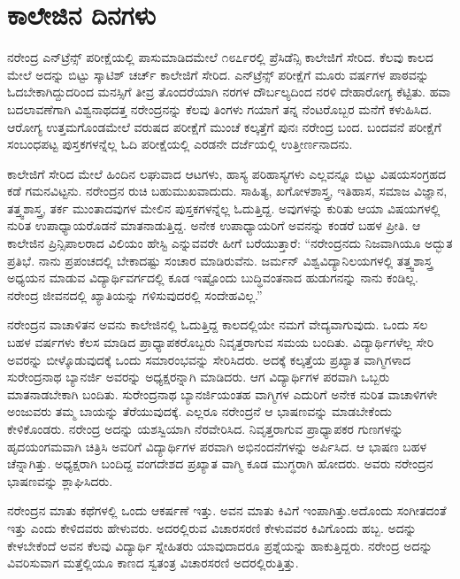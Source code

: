 
\chapter{ಕಾಲೇಜಿನ ದಿನಗಳು }

ನರೇಂದ್ರ ಎನ್‍ಟ್ರೆನ್ಸ್ ಪರೀಕ್ಷೆಯಲ್ಲಿ ಪಾಸುಮಾಡಿದಮೇಲೆ ೧೮೭೯ರಲ್ಲಿ ಪ್ರೆಸಿಡೆನ್ಸಿ ಕಾಲೇಜಿಗೆ ಸೇರಿದ. ಕೆಲವು ಕಾಲದ ಮೇಲೆ ಅದನ್ನು ಬಿಟ್ಟು ಸ್ಕಾಟಿಶ್ ಚರ್ಚ್ ಕಾಲೇಜಿಗೆ ಸೇರಿದ. ಎನ್‍ಟ್ರೆನ್ಸ್ ಪರೀಕ್ಷೆಗೆ ಮೂರು ವರ್ಷಗಳ ಪಾಠವನ್ನು ಓದಬೇಕಾಗಿದ್ದುದರಿಂದ ಮನಸ್ಸಿಗೆ ತೀವ್ರ ತೊಂದರೆಯಾಗಿ ನರಗಳ ದೌರ್ಬಲ್ಯದಿಂದ ನರಳಿ ದೇಹಾರೋಗ್ಯ ಕೆಟ್ಟಿತು. ಹವಾ ಬದಲಾವಣೆಗಾಗಿ ವಿಶ್ವನಾಥದತ್ತ ನರೇಂದ್ರನನ್ನು ಕೆಲವು ತಿಂಗಳು ಗಯಾಗೆ ತನ್ನ ನೆಂಟರೊಬ್ಬರ ಮನೆಗೆ ಕಳುಹಿಸಿದ. ಆರೋಗ್ಯ ಉತ್ತಮಗೊಂಡಮೇಲೆ ವರುಷದ ಪರೀಕ್ಷೆಗೆ ಮುಂಚೆ ಕಲ್ಕತ್ತೆಗೆ ಪುನಃ ನರೇಂದ್ರ ಬಂದ. ಬಂದವನೆ ಪರೀಕ್ಷೆಗೆ ಸಂಬಂಧಪಟ್ಟ ಪುಸ್ತಕಗಳನ್ನೆಲ್ಲ ಓದಿ ಪರೀಕ್ಷೆಯಲ್ಲಿ ಎರಡನೇ ದರ್ಜೆಯಲ್ಲಿ ಉತ್ತೀರ್ಣನಾದನು.

ಕಾಲೇಜಿಗೆ ಸೇರಿದ ಮೇಲೆ ಹಿಂದಿನ ಲಘುವಾದ ಆಟಗಳು, ಹಾಸ್ಯ ಪರಿಹಾಸ್ಯಗಳು ಎಲ್ಲವನ್ನೂ ಬಿಟ್ಟು ವಿಷಯಸಂಗ್ರಹದ ಕಡೆ ಗಮನವಿಟ್ಟನು. ನರೇಂದ್ರನ ರುಚಿ ಬಹುಮುಖವಾದುದು. ಸಾಹಿತ್ಯ, ಖಗೋಳಶಾಸ್ತ್ರ, ಇತಿಹಾಸ, ಸಮಾಜ ವಿಜ್ಞಾನ, ತತ್ತ್ವಶಾಸ್ತ್ರ, ತರ್ಕ ಮುಂತಾದವುಗಳ ಮೇಲಿನ ಪುಸ್ತಕಗಳನ್ನೆಲ್ಲ ಓದುತ್ತಿದ್ದ. ಅವುಗಳನ್ನು ಕುರಿತು ಆಯಾ ವಿಷಯಗಳಲ್ಲಿ ನುರಿತ ಉಪಾಧ್ಯಾಯರೊಡನೆ ಮಾತನಾಡುತ್ತಿದ್ದ. ಅನೇಕ ಉಪಾಧ್ಯಾಯರಿಗೆ ಅವನನ್ನು ಕಂಡರೆ ಬಹಳ ಪ್ರೀತಿ. ಆ ಕಾಲೇಜಿನ ಪ್ರಿನ್ಸಿಪಾಲರಾದ ವಿಲಿಯಂ ಹೇಸ್ಟಿ ಎನ್ನುವವರೇ ಹೀಗೆ ಬರೆಯುತ್ತಾರೆ: “ನರೇಂದ್ರನದು ನಿಜವಾಗಿಯೂ ಅದ್ಭುತ ಪ್ರತಿಭೆ. ನಾನು ಪ್ರಪಂಚದಲ್ಲಿ ಬೇಕಾದಷ್ಟು ಸಂಚಾರ ಮಾಡಿರುವೆನು. ಜರ್ಮನ್ ವಿಶ್ವವಿದ್ಯಾನಿಲಯಗಳಲ್ಲಿ ತತ್ತ್ವಶಾಸ್ತ್ರ ಅಧ್ಯಯನ ಮಾಡುವ ವಿದ್ಯಾರ್ಥಿವರ್ಗದಲ್ಲಿ ಕೂಡ ಇಷ್ಟೊಂದು ಬುದ್ಧಿವಂತನಾದ ಹುಡುಗನನ್ನು ನಾನು ಕಂಡಿಲ್ಲ. ನರೇಂದ್ರ ಜೀವನದಲ್ಲಿ ಖ್ಯಾತಿಯನ್ನು ಗಳಿಸುವುದರಲ್ಲಿ ಸಂದೇಹವಿಲ್ಲ.”

ನರೇಂದ್ರನ ವಾಚಾಳಿತನ ಅವನು ಕಾಲೇಜಿನಲ್ಲಿ ಓದುತ್ತಿದ್ದ ಕಾಲದಲ್ಲಿಯೇ ನಮಗೆ ವೇದ್ಯವಾಗುವುದು. ಒಂದು ಸಲ ಬಹಳ ವರ್ಷಗಳು ಕೆಲಸ ಮಾಡಿದ ಪ್ರಾಧ್ಯಾಪಕರೊಬ್ಬರು ನಿವೃತ್ತರಾಗುವ ಸಮಯ ಬಂದಿತು. ವಿದ್ಯಾರ್ಥಿಗಳೆಲ್ಲ ಸೇರಿ ಅವರನ್ನು ಬೀಳ್ಕೊಡುವುದಕ್ಕೆ ಒಂದು ಸಮಾರಂಭವನ್ನು ಸೇರಿಸಿದರು. ಅದಕ್ಕೆ ಕಲ್ಕತ್ತೆಯ ಪ್ರಖ್ಯಾತ ವಾಗ್ಮಿಗಳಾದ ಸುರೇಂದ್ರನಾಥ ಬ್ಯಾನರ್ಜಿ ಅವರನ್ನು ಅಧ್ಯಕ್ಷರನ್ನಾಗಿ ಮಾಡಿದರು. ಆಗ ವಿದ್ಯಾರ್ಥಿಗಳ ಪರವಾಗಿ ಒಬ್ಬರು ಮಾತನಾಡಬೇಕಾಗಿ ಬಂದಿತು. ಸುರೇಂದ್ರನಾಥ ಬ್ಯಾನರ್ಜಿಯಂತಹ ವಾಗ್ಮಿಗಳ ಎದುರಿಗೆ ಅನೇಕ ನುರಿತ ವಾಚಾಳಿಗಳೇ ಅಂಜುವರು ತಮ್ಮ ಬಾಯನ್ನು ತೆರೆಯುವುದಕ್ಕೆ. ಎಲ್ಲರೂ ನರೇಂದ್ರನೆ ಆ ಭಾಷಣವನ್ನು ಮಾಡಬೇಕೆಂದು ಕೇಳಿಕೊಂಡರು. ನರೇಂದ್ರ ಅದನ್ನು ಯಶಸ್ವಿಯಾಗಿ ನೆರವೇರಿಸಿದ. ನಿವೃತ್ತರಾಗುವ ಪ್ರಾಧ್ಯಾಪಕರ ಗುಣಗಳನ್ನು ಹೃದಯಂಗಮವಾಗಿ ಚಿತ್ರಿಸಿ ಅವರಿಗೆ ವಿದ್ಯಾರ್ಥಿಗಳ ಪರವಾಗಿ ಅಭಿನಂದನೆಗಳನ್ನು ಅರ್ಪಿಸಿದ. ಆ ಭಾಷಣ ಬಹಳ ಚೆನ್ನಾಗಿತ್ತು. ಅಧ್ಯಕ್ಷರಾಗಿ ಬಂದಿದ್ದ ವಂಗದೇಶದ ಪ್ರಖ್ಯಾತ ವಾಗ್ಮಿ ಕೂಡ ಮುಗ್ಧರಾಗಿ ಹೋದರು. ಅವರು ನರೇಂದ್ರನ ಭಾಷಣವನ್ನು ಶ್ಲಾಘಿಸಿದರು.

ನರೇಂದ್ರನ ಮಾತು ಕಥೆಗಳಲ್ಲಿ ಒಂದು ಆಕರ್ಷಣೆ ಇತ್ತು. ಅವನ ಮಾತು ಕಿವಿಗೆ ಇಂಪಾಗಿತ್ತು.ಅದೊಂದು ಸಂಗೀತದಂತೆ ಇತ್ತು ಎಂದು ಕೇಳಿದವರು ಹೇಳುವರು. ಅದರಲ್ಲಿರುವ ವಿಚಾರಸರಣಿ ಕೇಳುವವರ ಕಿವಿಗೊಂದು ಹಬ್ಬ. ಅದನ್ನು ಕೇಳಬೇಕೆಂದೆ ಅವನ ಕೆಲವು ವಿದ್ಯಾರ್ಥಿ ಸ್ನೇಹಿತರು ಯಾವುದಾದರೂ ಪ್ರಶ್ನೆಯನ್ನು ಹಾಕುತ್ತಿದ್ದರು. ನರೇಂದ್ರ ಅದನ್ನು ವಿವರಿಸುವಾಗ ಮತ್ತೆಲ್ಲಿಯೂ ಕಾಣದ ಸ್ವತಂತ್ರ ವಿಚಾರಸರಣಿ ಅದರಲ್ಲಿರುತ್ತಿತ್ತು.

